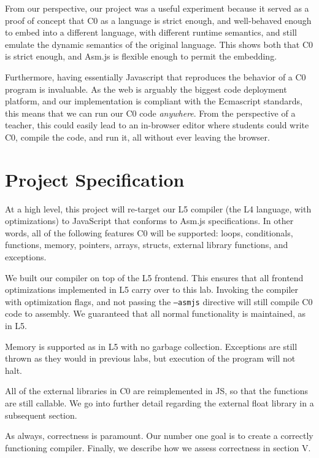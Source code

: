 \documentclass[twoside]{article}
\begin{document}
\begin{multicols}{2}
From our perspective, our project was a useful experiment because it served 
as a proof of concept that C0 as a language is strict enough, and well-behaved
enough to embed into a different language, with different runtime semantics, 
and still emulate the dynamic semantics of the original language. This shows
both that C0 is strict enough, and Asm.js is flexible enough to permit the 
embedding. 

Furthermore, having essentially Javascript that reproduces the behavior of a 
C0 program is invaluable. As the web is arguably the biggest code deployment 
platform, and our implementation is compliant with the Ecmascript standards, 
this means that we can run our C0 code \emph{anywhere}. From the perspective
of a teacher, this could easily lead to an in-browser editor where students 
could write C0, compile the code, and run it, all without ever leaving the 
browser.


\section{Project Specification}

At a high level, this project will re-target our L5 compiler (the L4 language,
with optimizations) to JavaScript that conforms to Asm.js specifications. In other
words, all of the following features C0 will be supported: loops, conditionals,
functions, memory, pointers, arrays, structs, external library functions, and
exceptions.

  We built our compiler on top of the L5 frontend. This ensures that all 
  frontend optimizations implemented in L5 carry over to this lab. Invoking
  the compiler with optimization flags, and not passing the \texttt{--asmjs}
  directive will still compile C0 code to assembly. We guaranteed that all
  normal functionality is maintained, as in L5. 

  Memory is supported as in L5 with no garbage collection. Exceptions are
  still thrown as they would in previous labs, but execution of the program
  will not halt.

  All of the external libraries in C0 are reimplemented in JS, so that the functions
  are still callable. We go into further detail regarding the external float library
  in a subsequent section. 

As always, correctness is paramount. Our number one goal is to create a correctly
functioning compiler. Finally, we describe how we assess correctness in section V. 


\end{multicols}
\end{document}
